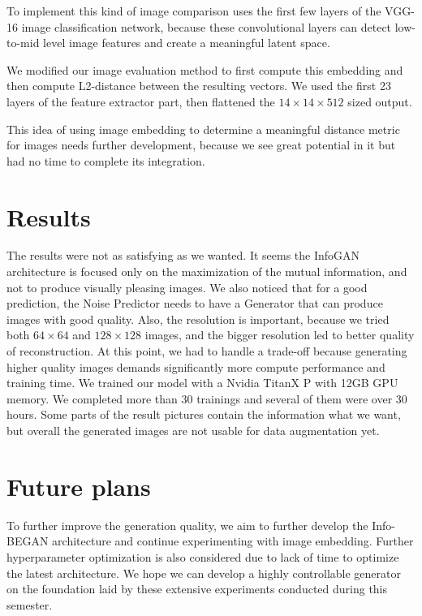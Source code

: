 \documentclass{egpubl}
\begin{document}
To implement this kind of image comparison \cite{abdal2019image2stylegan} uses the first few layers of the VGG-16 image classification network, because these convolutional layers can detect low-to-mid level image features and create a meaningful latent space.

We modified our image evaluation method to first compute this embedding and then compute L2-distance between the resulting vectors. We used the first 23 layers of the feature extractor part, then flattened the $14\times 14\times 512$ sized output.

This idea of using image embedding to determine a meaningful distance metric for images needs further development, because we see great potential in it but had no time to complete its integration.

\section{Results}
The results were not as satisfying as we wanted. It seems the InfoGAN architecture is focused only on the maximization of the mutual information, and not to produce visually pleasing images. We also noticed that for a good prediction, the Noise Predictor needs to have a Generator that can produce images with good quality. Also, the resolution is important, because we tried both $64\times 64$ and $128\times 128$ images, and the bigger resolution led to better quality of reconstruction. At this point, we had to handle a trade-off because generating higher quality images demands significantly more compute performance and training time. We trained our model with a Nvidia TitanX P with 12GB GPU memory. We completed more than 30 trainings and several of them were over 30 hours. Some parts of the result pictures contain the information what we want, but overall the generated images are not usable for data augmentation yet.

\section{Future plans}
To further improve the generation quality, we aim to further develop the Info-BEGAN architecture and continue experimenting with image embedding. Further hyperparameter optimization is also considered due to lack of time to optimize the latest architecture. We hope we can develop a highly controllable generator on the foundation laid by these extensive experiments conducted during this semester.
\end{document}
